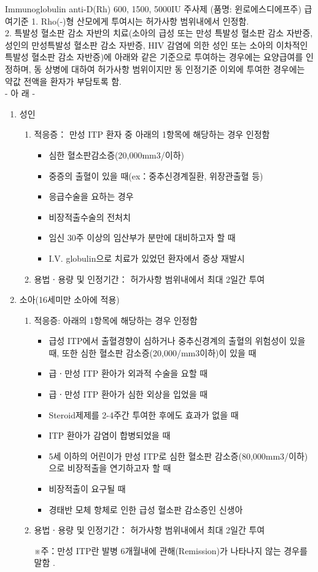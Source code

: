 \begin{Cdoing}{Immunoglobulin anti-D(Rh) 600, 1500, 5000IU 주사제 (품명: 윈로에스디에프주) 급여기준}
1. Rho(-)형 산모에게 투여시는 허가사항 범위내에서 인정함.\\ 
2. 특발성 혈소판 감소 자반의 치료(소아의 급성 또는 만성 특발성 혈소판 감소 자반증, 성인의 만성특발성 혈소판 감소 자반증, HIV 감염에 의한 성인 또는 소아의 이차적인 특발성 혈소판 감소 자반증)에 아래와 같은 기준으로 투여하는 경우에는 요양급여를 인정하며, 동 상병에 대하여 허가사항 범위이지만 동 인정기준 이외에 투여한 경우에는 약값 전액을 환자가 부담토록 함.\\ 
- 아 래 -
\begin{enumerate}[(1)]\tightlist
\item 성인 
	\begin{enumerate}[(가)]\tightlist
	\item 적응증： 만성 ITP 환자 중 아래의 1항목에 해당하는 경우 인정함 
		\begin{itemize}\tightlist
		\item 심한 혈소판감소증(20,000mm3/이하) 
		\item 중증의 출혈이 있을 때(ex：중추신경계질환, 위장관출혈 등) 
		\item 응급수술을 요하는 경우 
		\item 비장적출수술의 전처치 
		\item 임신 30주 이상의 임산부가 분만에 대비하고자 할 때 
		\item I.V. globulin으로 치료가 있었던 환자에서 증상 재발시 
		\end{itemize}
	\item 용법ㆍ용량 및 인정기간： 허가사항 범위내에서 최대 2일간 투여
  	\end{enumerate}
\item 소아(16세미만 소아에 적용) 
	\begin{enumerate}[(가)]\tightlist
	\item 적응증: 아래의 1항목에 해당하는 경우 인정함 
		\begin{itemize}\tightlist
		\item 급성 ITP에서 출혈경향이 심하거나 중추신경계의 출혈의 위험성이 있을 때, 또한 심한 혈소판 감소증(20,000/mm3이하)이 있을 때 
		\item 급ㆍ만성 ITP 환아가 외과적 수술을 요할 때 
		\item 급ㆍ만성 ITP 환아가 심한 외상을 입었을 때 
		\item Steroid제제를 2-4주간 투여한 후에도 효과가 없을 때 
		\item ITP 환아가 감염이 합병되었을 때 
		\item 5세 이하의 어린이가 만성 ITP로 심한 혈소판 감소증(80,000mm3/이하)으로 비장적출을 연기하고자 할 때 
		\item 비장적출이 요구될 때 
		\item 경태반 모체 항체로 인한 급성 혈소판 감소증인 신생아 
		\end{itemize}
	\item 용법ㆍ용량 및 인정기간： 허가사항 범위내에서 최대 2일간 투여 
	\item [※주：만성 ITP란 발병 6개월내에 관해(Remission)가 나타나지 않는 경우를 말함].
	\end{enumerate}
\end{enumerate}
\end{Cdoing}